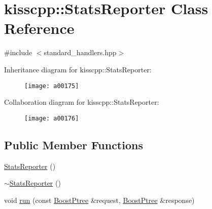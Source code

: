 \hypertarget{a00043}{\section{kisscpp\-:\-:Stats\-Reporter Class Reference}
\label{a00043}
}


{\ttfamily \#include $<$standard\-\_\-handlers.\-hpp$>$}



Inheritance diagram for kisscpp\-:\-:Stats\-Reporter\-:\nopagebreak
\begin{figure}[H]
\begin{center}
\leavevmode
\texttt{[image: a00175]}
\end{center}
\end{figure}


Collaboration diagram for kisscpp\-:\-:Stats\-Reporter\-:\nopagebreak
\begin{figure}[H]
\begin{center}
\leavevmode
\texttt{[image: a00176]}
\end{center}
\end{figure}
\subsection*{Public Member Functions}
\begin{DoxyCompactItemize}
\item 
\hyperlink{a00043_a07215d1f69aabea8e60a49a930d11401}{Stats\-Reporter} ()
\item 
\hyperlink{a00043_a147cf5af12711d7cc5617d6538724e07}{$\sim$\-Stats\-Reporter} ()
\item 
void \hyperlink{a00043_af57d8c01b118a4693b8b226c3f9dbbe5}{run} (const \hyperlink{a00048_ab36820650b8e0db36402aea80485633c}{Boost\-Ptree} \&request, \hyperlink{a00048_ab36820650b8e0db36402aea80485633c}{Boost\-Ptree} \&response)
\end{DoxyCompactItemize}


